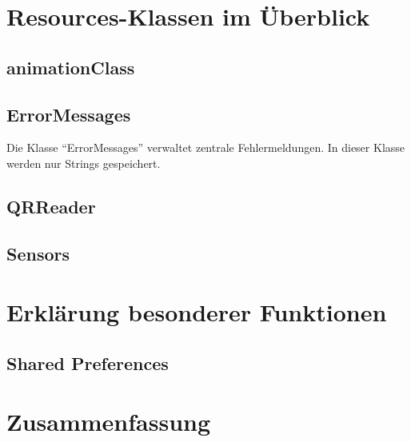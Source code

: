 \documentclass[11pt]{article} %
\begin{document}
\section{Resources-Klassen im Überblick}

\subsection{animationClass}

\subsection{ErrorMessages}
Die Klasse \enquote{ErrorMessages} verwaltet zentrale Fehlermeldungen. In dieser Klasse werden nur Strings gespeichert.

\subsection{QRReader}

\subsection{Sensors}

\section{Erklärung besonderer Funktionen}

\subsection{Shared Preferences}

\section{Zusammenfassung}
\end{document}
